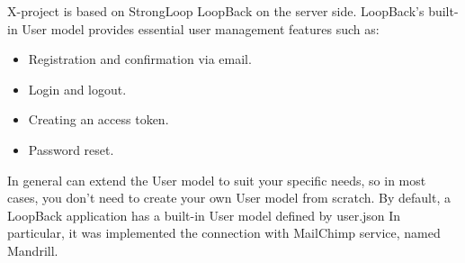 X-project is based on StrongLoop LoopBack on the server side.
LoopBack's built-in User model provides essential user management features such as:
\begin{itemize}
\item Registration and confirmation via email.
\item Login and logout.
\item Creating an access token.
\item Password reset. 
\end{itemize}
In general can extend the User model to suit your specific needs, so in most cases, you don't need to create your own User model from scratch.
By default, a LoopBack application has a built-in User model defined by user.json
In particular, it was implemented the connection with MailChimp service, named Mandrill.

